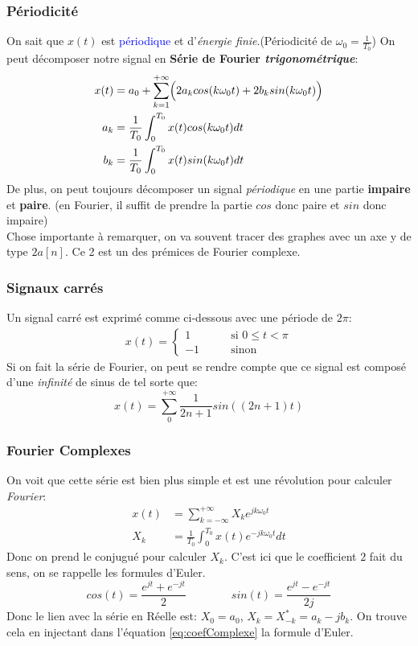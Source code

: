 \documentclass{report}
\begin{document}
\subsubsection{Périodicité}
On sait que $x(t)$ est \textcolor{blue}{périodique} et d'\textit{énergie finie}.(Périodicité de $\omega_0 = \frac{1}{T_0}$) On peut décomposer notre signal en \textbf{Série de Fourier \textit{trigonométrique}}:
\begin{align}
x(t) &= a_0 + \sum_{k=1}^{+\infty} \Bigl(2 a_k cos(k\omega_0 t) + 2b_k sin(k \omega_0 t) \Bigl)\\
a_k &= \frac{1}{T_0} \int_0^{T_0} x(t) cos(k\omega_0t)dt\\
b_k &= \frac{1}{T_0} \int_0^{T_0} x(t) sin(k\omega_0t)dt
\end{align}
De plus, on peut toujours décomposer un signal \textit{périodique} en une partie \textbf{impaire} et \textbf{paire}. (en Fourier, il suffit de prendre la partie $cos$ donc paire et $sin$ donc impaire)\\

Chose importante à remarquer, on va souvent tracer des graphes avec un axe y de type $2a[n]$. Ce 2 est un des prémices de Fourier complexe.

\subsubsection{Signaux carrés}
Un signal carré est exprimé comme ci-dessous avec une période de $2\pi$:
\begin{align}
x(t) = \begin{cases}
1 \qquad &\text{si } 0 \leq t < \pi\\
-1 \qquad &\text{sinon}
\end{cases}
\end{align}
Si on fait la série de Fourier, on peut se rendre compte que ce signal est composé d'une \textit{infinité} de sinus de tel sorte que:
\begin{equation}
x(t) = \sum_0^{+\infty} \frac{1}{2n+1} sin((2n+1)t)
\end{equation}

\subsubsection{Fourier Complexes}
On voit que cette série est bien plus simple et est une révolution pour calculer \textit{Fourier}:
\begin{align}
x(t) &= \sum_{k = - \infty}^{+ \infty} X_k e^{jk\omega_0 t}\\
X_k &= \frac{1}{T_0} \int_0^{T_0} x(t) e^{-jk\omega_0t}dt \label{eq:coefComplexe}
\end{align}
Donc on prend le conjugué pour calculer $X_k$. C'est ici que le coefficient $2$ fait du sens, on se rappelle les formules d'Euler.
\begin{equation}
cos(t) = \frac{e^{jt} + e^{-jt}}{2} \qquad \qquad sin(t) = \frac{e^{jt} - e^{-jt}}{2j}
\end{equation}
Donc le lien avec la série en Réelle est: $X_0 = a_0$, $X_k = X_{-k}^{*} = a_k -jb_k$. On trouve cela en injectant dans l'équation \ref{eq:coefComplexe} la formule d'Euler.
\end{document}
